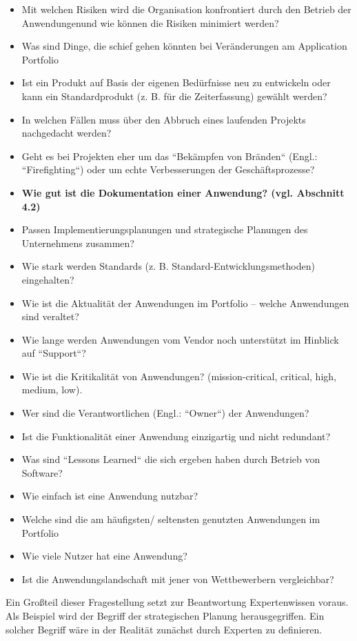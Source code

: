 \begin{itemize}
\item Mit welchen Risiken wird die Organisation konfrontiert durch den Betrieb der Anwendungenund wie können die Risiken minimiert werden?
\item Was sind Dinge, die schief gehen könnten bei Veränderungen am Application Portfolio
\item Ist ein Produkt auf Basis der eigenen Bedürfnisse neu zu entwickeln oder kann ein Standardprodukt (z. B. für die Zeiterfassung) gewählt werden?
\item In welchen Fällen muss über den Abbruch eines laufenden Projekts nachgedacht werden?
\item Geht es bei Projekten eher um das ``Bekämpfen von Bränden`` (Engl.: ``Firefighting``) oder um echte Verbesserungen der Geschäftsprozesse?
\item {\bf Wie gut ist die Dokumentation einer Anwendung? (vgl. Abschnitt 4.2)}
\item Passen Implementierungsplanungen und strategische Planungen des Unternehmens zusammen?
\item Wie stark werden Standards (z. B. Standard-Entwicklungsmethoden) eingehalten?
\item Wie ist die Aktualität der Anwendungen im Portfolio – welche Anwendungen sind veraltet?
\item Wie lange werden Anwendungen vom Vendor noch unterstützt im Hinblick auf ``Support``?
\item Wie ist die Kritikalität von Anwendungen? (mission-critical, critical, high, medium, low).
\item Wer sind die Verantwortlichen (Engl.: ``Owner``) der Anwendungen?
\item Ist die Funktionalität einer Anwendung einzigartig und nicht redundant?
\item Was sind ``Lessons Learned`` die sich ergeben haben durch Betrieb von Software?
\item Wie einfach ist eine Anwendung nutzbar?
\item Welche sind die am häufigsten/ seltensten genutzten Anwendungen im Portfolio
\item Wie viele Nutzer hat eine Anwendung?
\item Ist die Anwendungslandschaft mit jener von Wettbewerbern vergleichbar?

\end{itemize}

Ein Großteil dieser Fragestellung setzt zur Beantwortung Expertenwissen voraus. Als Beispiel wird der Begriff der strategischen Planung herausgegriffen. Ein solcher Begriff wäre in der Realität zunächst durch Experten zu definieren. 

